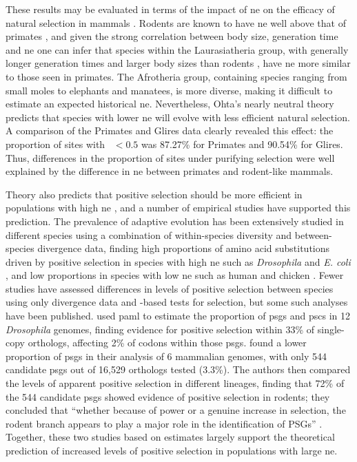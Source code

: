 These results may be evaluated in terms of the impact of \ac{ne} on
the efficacy of natural selection in mammals
\citep{Popadin2007,Nikolaev2007,Ellegren2009}. Rodents are known to
have \ac{ne} well above that of primates \citep{Kosiol2008}, and given
the strong correlation between body size, generation time and \ac{ne}
\citep{Nikolaev2007} one can infer that species within the
Laurasiatheria group, with generally longer generation times and
larger body sizes than rodents \citep{Hou2009}, have \ac{ne} more
similar to those seen in primates. The Afrotheria group, containing
species ranging from small moles to elephants and manatees, is more
diverse, making it difficult to estimate an expected historical
\ac{ne}. Nevertheless, Ohta's nearly neutral theory \citep{Ohta1992}
predicts that species with lower \ac{ne} will evolve with less
efficient natural selection. A comparison of the Primates and Glires
data clearly revealed this effect: the proportion of sites with
\omgml~$<0.5$ was 87.27\% for Primates and 90.54\% for Glires. Thus,
differences in the proportion of sites under purifying selection were
well explained by the difference in \ac{ne} between primates and
rodent-like mammals.

Theory also predicts that positive selection should be more efficient
in populations with high \ac{ne} \citep{Ellegren2009,Halligan2010},
and a number of empirical studies have supported this prediction. The
prevalence of adaptive evolution has been extensively studied in
different species using a combination of within-species diversity and
between-species divergence data, finding high proportions of amino
acid substitutions driven by positive selection in species with high
\ac{ne} such as \emph{Drosophila} \citep{Bierne2004} and
\emph{E. coli} \citep{Charlesworth2006}, and low proportions in
species with low \ac{ne} such as human
\citep{Zhang2005b,Sequencing2005a,Boyko2008} and chicken
\citep{Axelsson2009}. Fewer studies have assessed differences in
levels of positive selection between species using only divergence
data and \dnds-based tests for selection, but some such analyses have
been published. \citet{Clark2007} used \acs{paml} \citep{Yang2007} to estimate the
proportion of \acp{psg} and \acp{psc} in 12 \emph{Drosophila} genomes,
finding evidence for positive selection within 33\% of single-copy
orthologs, affecting 2\% of codons within those
\acp{psg}. \citet{Kosiol2008} found a lower proportion of \acp{psg} in
their analysis of 6 mammalian genomes, with only 544 candidate
\acp{psg} out of 16,529 orthologs tested (3.3\%). The authors then
compared the levels of apparent positive selection in different
lineages, finding that 72\% of the 544 candidate \acp{psg} showed
evidence of positive selection in rodents; they concluded that
``whether because of power or a genuine increase in selection, the
rodent branch appears to play a major role in the identification of
PSGs'' \citep{Kosiol2008}. Together, these two studies based on \dnds
estimates largely support the theoretical prediction of increased
levels of positive selection in populations with large \ac{ne}.

